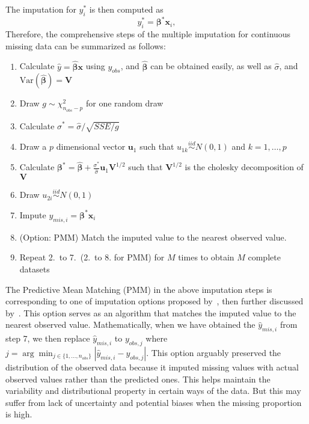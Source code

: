 The imputation for $y_i^*$ is then computed as 
\begin{equation} 
    y_i^*=\boldsymbol{\beta}^*\mathbf{x}_i,
\end{equation}
Therefore, the comprehensive steps of the multiple imputation for continuous missing data can be summarized as follows:
\begin{enumerate} 
    \item Calculate $\hat{y}=\hat{\boldsymbol{\beta}}\mathbf{x}$ using $y_{obs}$, and $\hat{\boldsymbol{\beta}}$ can be obtained easily, as well as $\hat{\sigma}$, and $\text{Var}(\hat{\boldsymbol{\beta}})=\mathbf{V}$
    \item Draw $g\sim \chi^2_{n_{obs}-p}$ for one random draw 
    \item Calculate $\sigma^*=\hat{\sigma}/\sqrt{SSE/g}$
    \item Draw a $p$ dimensional vector $\mathbf{u}_1$ such that $u_{1k}\stackrel{iid}{\sim} N(0,1)$ and $k=1,\ldots,p$
    \item Calculate $\boldsymbol{\beta}^*=\hat{\boldsymbol{\beta}}+\frac{\sigma^*}{\hat{\sigma}}\mathbf{u}_1\mathbf{V}^{1/2}$ such that $\mathbf{V}^{1/2}$ is the cholesky decomposition of $\mathbf{V}$
    \item Draw $u_{2i}\stackrel{iid}{\sim} N(0,1)$ 
    \item Impute $y_{mis,i}=\boldsymbol{\beta}^*\mathbf{x}_i$ 
    \item (Option: PMM) Match the imputed value to the nearest observed value.
    \item Repeat 2.\ to 7.\ (2.\ to 8. for PMM) for $M$ times to obtain $M$ complete datasets
\end{enumerate}

The Predictive Mean Matching (PMM) in the above imputation steps is corresponding to one of imputation options proposed by~\citet{rubin1986statistical}, then further discussed by~\citet{little1988missing}. 
This option serves as an algorithm that matches the imputed value to the nearest observed value. 
Mathematically, when we have obtained the $\hat{y}_{mis,i}$ from step 7, we then replace $\hat{y}_{mis,i}$ to $y_{obs,j}$ where $j=\arg\min_{j\in\{1,...,n_{obs}\}} |\hat{y}_{mis,i}-y_{obs,j}|$.
This option arguably preserved the distribution of the observed data because it imputed missing values with actual observed values rather than the predicted ones. 
This helps maintain the variability and distributional property in certain ways of the data. 
But this may suffer from lack of uncertainty and potential biases when the missing proportion is high. 

